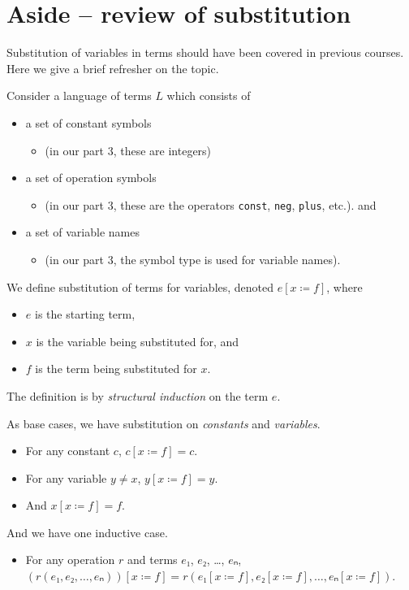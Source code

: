 \documentclass[11pt]{article}
\begin{document}
\section*{Aside – review of substitution}
\label{sec:orgd9a4a35}
Substitution of variables in terms should have been covered
in previous courses. Here we give a brief refresher
on the topic.

Consider a language of terms \(L\) which consists of
\begin{itemize}
\item a set of constant symbols
\begin{itemize}
\item (in our part 3, these are integers)
\end{itemize}
\item a set of operation symbols
\begin{itemize}
\item (in our part 3, these are the operators \texttt{const}, \texttt{neg}, \texttt{plus}, etc.). and
\end{itemize}
\item a set of variable names
\begin{itemize}
\item (in our part 3, the symbol type is used for variable names).
\end{itemize}
\end{itemize}

We define substitution of terms for variables,
denoted \(e[x ≔ f]\), where
\begin{itemize}
\item \(e\) is the starting term,
\item \(x\) is the variable being substituted for, and
\item \(f\) is the term being substituted for \(x\).
\end{itemize}
The definition is by \emph{structural induction} on the term \(e\).

As base cases, we have substitution on \emph{constants} and \emph{variables}.
\begin{itemize}
\item For any constant \(c\), \(c[x ≔ f] = c\).
\item For any variable \(y ≠ x\), \(y[x ≔ f] = y\).
\item And \(x[x ≔ f] = f\).
\end{itemize}

And we have one inductive case.
\begin{itemize}
\item For any operation \(r\) and terms \(e₁\), \(e₂\), …, \(eₙ\),
\((r(e₁,e₂,…,eₙ))[x ≔ f] = r(e₁[x ≔ f], e₂[x ≔ f], …, eₙ[x ≔ f])\).
\end{itemize}
\end{document}
